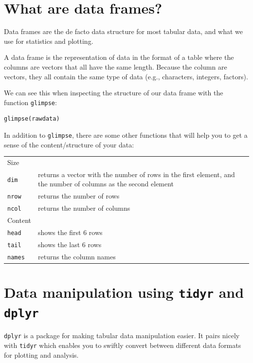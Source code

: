 \documentclass[11pt]{article}
\begin{document}
\section*{What are data frames?}
\label{sec-2}
Data frames are the de facto data structure for most tabular data, and what we use for statistics and plotting.

A data frame is the representation of data in the format of a table where the columns are vectors that all have the same length. Because the column are vectors, they all contain the same type of data (e.g., characters, integers, factors).

We can see this when inspecting the structure of our data frame with the function \texttt{glimpse}:

\begin{verbatim}
glimpse(rawdata)
\end{verbatim}

In addition to \texttt{glimpse}, there are some other functions that will help you to get a sense of the content/structure of your data:

\begin{center}
\begin{tabular}{ll}
Size & \\
\texttt{dim} & returns a vector with the number of rows in the first element, and the number of columns as the second element\\
\texttt{nrow} & returns the number of rows\\
\texttt{ncol} & returns the number of columns\\
Content & \\
\texttt{head} & shows the first 6 rows\\
\texttt{tail} & shows the last 6 rows\\
\texttt{names} & returns the column names\\
\end{tabular}
\end{center}


\section*{Data manipulation using \texttt{tidyr} and \texttt{dplyr}}
\label{sec-3}

\texttt{dplyr} is a package for making tabular data manipulation easier. It pairs nicely with \texttt{tidyr} which enables you to swiftly convert between different data formats for plotting and analysis.
\end{document}
